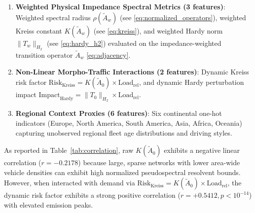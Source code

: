 \documentclass[journal]{IEEEtran}
\begin{document}
\begin{enumerate}
    \item \textbf{Weighted Physical Impedance Spectral Metrics (3 features)}: Weighted spectral radius $\rho(\tilde{A}_w)$ (see \eqref{eq:normalized_operators}), weighted Kreiss constant $K(\tilde{A}_w)$ (see \eqref{eq:kreiss}), and weighted Hardy norm $\|T_w\|_{H_2}$ (see \eqref{eq:hardy_h2}) evaluated on the impedance-weighted transition operator $\tilde{A}_w$ \eqref{eq:adjacency}.
    \item \textbf{Non-Linear Morpho-Traffic Interactions (2 features)}: Dynamic Kreiss risk factor $\text{Risk}_{\text{Kreiss}} = K(\tilde{A}_0) \times \text{Load}_{\text{rel}}$, and dynamic Hardy perturbation impact $\text{Impact}_{\text{Hardy}} = \|T_0\|_{H_2} \times \text{Load}_{\text{rel}}$.
    \item \textbf{Regional Context Proxies (6 features)}: Six continental one-hot indicators (Europe, North America, South America, Asia, Africa, Oceania) capturing unobserved regional fleet age distributions and driving styles.
\end{enumerate}

\begin{table}[htbp]
\caption{Statistical Correlation of Top Graph-Spectral Descriptors with Normalized Emissions}
\label{tab:correlation}
\centering
{}
\end{table}

As reported in Table~\ref{tab:correlation}, raw $K(\tilde{A}_0)$ exhibits a negative linear correlation ($r = -0.2178$) because large, sparse networks with lower area-wide vehicle densities can exhibit high normalized pseudospectral resolvent bounds. However, when interacted with demand via $\text{Risk}_{\text{Kreiss}} = K(\tilde{A}_0) \times \text{Load}_{\text{rel}}$, the dynamic risk factor exhibits a strong positive correlation ($r = +0.5412, p < 10^{-14}$) with elevated emission peaks.
\end{document}
